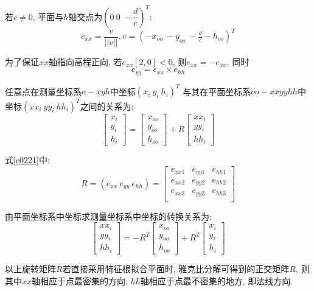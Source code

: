 若$c\neq 0$, 平面与$h$轴交点为$(0\ 0\ -\dfrac{d}{c})^T$:
\begin{equation}
    e_{xx} = \frac{v}{||v||}, v=(-x_{oo}\ -y_{oo}\ -\tfrac{d}{c}-h_{oo})^T
\end{equation}

为了保证$xx$轴指向高程正向, 若$e_{xx}[2,0]<0$, 则$e_{xx}=-e_{xx}$. 同时
\begin{equation}
    e_{yy}=e_{xx}\times e_{hh}
\end{equation}

任意点在测量坐标系$o-xyh$中坐标$(x_i\ y_i\ h_i)^T$ 与其在平面坐标系$oo-xxyyhh$中坐标$(xx_i\ yy_i\ hh_i)^T$之间的关系为:
\begin{equation}
    \begin{bmatrix}
        x_i\\
        y_i\\
        h_i 
    \end{bmatrix}
    =
    \begin{bmatrix}
        x_{oo}\\
        y_{oo}\\
        h_{oo}
    \end{bmatrix}
    +R 
    \begin{bmatrix}
        xx_i\\
        yy_i\\
        hh_i
    \end{bmatrix}
    \label{e0221}
\end{equation}

式\eqref{e0221}中:
\begin{equation}
    R=(e_{xx}\ e_{yy}\ e_{hh})= 
    \begin{bmatrix}
        e_{xx1} & e_{yy1} & e_{hh1} \\
        e_{xx2} & e_{yy2} & e_{hh2} \\
        e_{xx3} & e_{yy3} & e_{hh3} \\
    \end{bmatrix}
\end{equation}

由平面坐标系中坐标求测量坐标系中坐标的转换关系为:
\begin{equation}
    \begin{bmatrix}
        xx_i\\
        yy_i\\
        hh_i
    \end{bmatrix}
    =-R^T
    \begin{bmatrix}
        x_{oo}\\
        y_{oo}\\
        h_{oo}
    \end{bmatrix}
    +R^T
    \begin{bmatrix}
        x_i\\
        y_i\\
        h_i 
    \end{bmatrix}
\end{equation}

以上旋转矩阵$R$若直接采用特征根拟合平面时, 雅克比分解可得到的正交矩阵$R$, 则其中$xx$轴相应于点最密集的方向, $hh$轴相应于点最不密集的地方, 即法线方向.